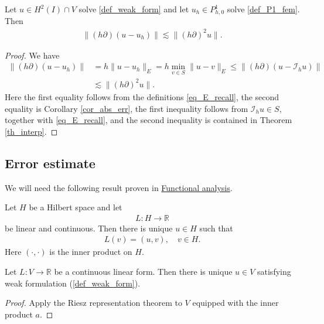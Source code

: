 \documentclass[12pt,oneside,final]{amsart}
\def\R{\mathbb R}
\def\I{\mathcal I}
\begin{document}
\begin{theorem}\label{th_err_deriv}
Let $u \in H^2(I) \cap V$ solve \eqref{def_weak_form}
and let $u_h \in P_{h,0}^1$ solve \eqref{def_P1_fem}.
Then
    \begin{align*}
\|(h\partial)(u-u_h)\|
\lesssim
\|(h \partial)^2 u\|.
    \end{align*}
\end{theorem}
\begin{proof}
We have
    \begin{align*}
\|(h\partial)(u-u_h)\|
&= 
h\|u-u_h\|_E 
= 
h \min_{v \in S}\|u-v\|_E
\le 
\|(h\partial)(u-\I_h u)\|
\\&\lesssim
\|(h \partial)^2 u\|.
    \end{align*}
Here the first equality follows from the definitions \eqref{eq_E_recall},
the second equality is Corollary \ref{cor_abs_err},
the first inequality follows from $\I_h u \in S$, together with \eqref{eq_E_recall}, and the second inequality is contained in Theorem \ref{th_interp}. 
\end{proof}

\subsection{Error estimate}

We will need the following result proven in \href{https://studies.helsinki.fi/courses/cu/hy-CU-117627226-2021-08-01}{Functional analysis}.

\begin{theorem}\label{th_riesz}
Let $H$ be a Hilbert space and let 
    \begin{align*}
L : H \to \R
    \end{align*}
be linear and continuous. 
Then there is unique $u \in H$ such that 
    \begin{align*}
L(v) = (u,v), \quad v \in H.
    \end{align*}
Here $(\cdot,\cdot)$ is the inner product on $H$.
\end{theorem}

\begin{corollary}
Let $L : V \to \R$ be a continuous linear form. 
Then there is unique $u \in V$ satisfying weak formulation (\ref{def_weak_form}).
\end{corollary}
\begin{proof}
Apply the Riesz representation theorem to $V$ equipped with the inner product $a$.
\end{proof}
\end{document}
